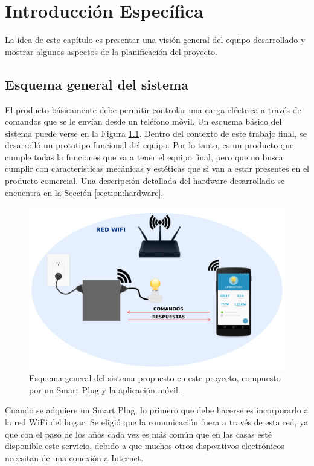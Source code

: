 \chapter{Introducción Específica} %

\label{Chapter2}

La idea de este capítulo es presentar una visión general del equipo desarrollado y mostrar algunos aspectos de la planificación del proyecto.


\section{Esquema general del sistema}

El producto básicamente debe permitir controlar una carga eléctrica a través de comandos que se le envían desde un teléfono móvil. Un esquema básico del sistema puede verse en la Figura \ref{fig:esquema_sistema}. Dentro del contexto de este trabajo final, se desarrolló un prototipo funcional del equipo. Por lo tanto, es un producto que cumple todas la funciones que va a tener el equipo final, pero que no busca cumplir con características mecánicas y estéticas que si van a estar presentes en el producto comercial. Una descripción detallada del hardware desarrollado se encuentra en la Sección \ref{section:hardware}.

\begin{figure}[h]
	\centering
	\includegraphics[width=12cm]{./Figures/2_1_esquema_sistema.png}
	\caption{Esquema general del sistema propuesto en este proyecto, compuesto por un Smart Plug y la aplicación móvil.}
	\label{fig:esquema_sistema}
\end{figure}

Cuando se adquiere un Smart Plug, lo primero que debe hacerse es incorporarlo a la red WiFi del hogar. Se eligió que la comunicación fuera a través de esta red, ya que con el paso de los años cada vez es más común que en las casas esté disponible este servicio, debido a que muchos otros dispositivos electrónicos necesitan de una conexión a Internet.

